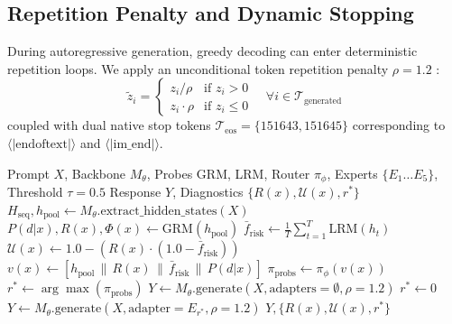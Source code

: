 \documentclass[journal,10pt,twocolumn]{IEEEtran}
\begin{document}
\subsection{Repetition Penalty and Dynamic Stopping}
During autoregressive generation, greedy decoding can enter deterministic repetition loops. We apply an unconditional token repetition penalty $\rho = 1.2$ \cite{keskar2019ctrl}:
\begin{equation}
\tilde{z}_i = \begin{cases} z_i / \rho & \text{if } z_i > 0 \\ z_i \cdot \rho & \text{if } z_i \le 0 \end{cases} \quad \forall i \in \mathcal{T}_{\text{generated}}
\end{equation}
coupled with dual native stop tokens $\mathcal{T}_{\text{eos}} = \{151643, 151645\}$ corresponding to $\langle|\text{endoftext}|\rangle$ and $\langle|\text{im\_end}|\rangle$.

\begin{algorithm}[t]
\caption{ARES Adaptive Inference Execution}
\label{alg:ares}
\begin{algorithmic}[1]
\REQUIRE Prompt $X$, Backbone $M_\theta$, Probes GRM, LRM, Router $\pi_\phi$, Experts $\{E_1 \dots E_5\}$, Threshold $\tau=0.5$
\ENSURE Response $Y$, Diagnostics $\{R(x), \mathcal{U}(x), r^*\}$
\STATE $H_{\text{seq}}, h_{\text{pool}} \leftarrow M_\theta.\text{extract\_hidden\_states}(X)$
\STATE $P(d|x), R(x), \Phi(x) \leftarrow \text{GRM}(h_{\text{pool}})$
\STATE $\bar{f}_{\text{risk}} \leftarrow \frac{1}{T} \sum_{t=1}^T \text{LRM}(h_t)$
\STATE $\mathcal{U}(x) \leftarrow 1.0 - (R(x) \cdot (1.0 - \bar{f}_{\text{risk}}))$
\STATE $v(x) \leftarrow [h_{\text{pool}} \,\|\, R(x) \,\|\, \bar{f}_{\text{risk}} \,\|\, P(d|x)]$
\STATE $\pi_{\text{probs}} \leftarrow \pi_\phi(v(x))$
\STATE $r^* \leftarrow \arg\max(\pi_{\text{probs}})$
    \STATE $Y \leftarrow M_\theta.\text{generate}(X, \text{adapters}=\emptyset, \rho=1.2)$ 
    \STATE $r^* \leftarrow 0$
\ELSE
    \STATE $Y \leftarrow M_\theta.\text{generate}(X, \text{adapter}=E_{r^*}, \rho=1.2)$ 
\ENDIF
\RETURN $Y, \{R(x), \mathcal{U}(x), r^*\}$
\end{algorithmic}
\end{algorithm}
\end{document}

